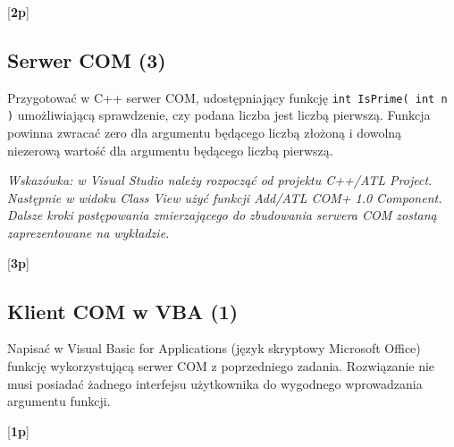       [{\bf 2p}]

\subsection {Serwer COM (3)}

      Przygotować w C++ serwer COM, udostępniający funkcję {\tt int IsPrime( int n )} umożliwiającą sprawdzenie, czy podana liczba jest liczbą 
\label{com_server}	  	  
	  pierwszą. Funkcja powinna zwracać
      zero dla argumentu będącego liczbą złożoną i dowolną niezerową wartość dla argumentu będącego liczbą pierwszą.

      {\em Wskazówka: w Visual Studio należy rozpocząć od projektu C++/ATL Project. 
      Następnie w widoku Class View użyć funkcji Add/ATL COM+ 1.0 Component. 
      Dalsze kroki postępowania zmierzającego do zbudowania serwera COM zostaną
      zaprezentowane na wykładzie.}

      [{\bf 3p}]

\subsection {Klient COM w VBA (1)}

      Napisać w Visual Basic for Applications (język skryptowy Microsoft Office) funkcję wykorzystującą serwer COM z poprzedniego zadania. 
	  Rozwiązanie nie musi posiadać żadnego interfejsu użytkownika do wygodnego wprowadzania argumentu funkcji.

      [{\bf 1p}]

	  